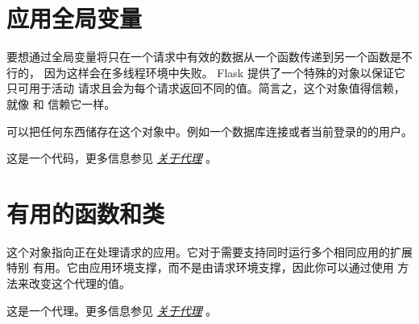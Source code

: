 \documentclass[a4paper,12pt]{sphinxmanual}
\begin{document}
\section{应用全局变量}
\label{api:id9}
要想通过全局变量将只在一个请求中有效的数据从一个函数传递到另一个函数是不行的，
因为这样会在多线程环境中失败。 Flask 提供了一个特殊的对象以保证它只可用于活动
请求且会为每个请求返回不同的值。简言之，这个对象值得信赖，就像
{\hyperref[api:flask.request]{}} 和 {\hyperref[api:flask.session]{}} 信赖它一样。

\begin{fulllineitems}
\label{api:flask.g}
可以把任何东西储存在这个对象中。例如一个数据库连接或者当前登录的的用户。

这是一个代码，更多信息参见 {\hyperref[reqcontext:notes-on-proxies]{\emph{关于代理}}} 。

\end{fulllineitems}



\section{有用的函数和类}
\label{api:id10}

\begin{fulllineitems}
\label{api:flask.current_app}
这个对象指向正在处理请求的应用。它对于需要支持同时运行多个相同应用的扩展特别
有用。它由应用环境支撑，而不是由请求环境支撑，因此你可以通过使用
{\hyperref[api:flask.Flask.app_context]{}} 方法来改变这个代理的值。

这是一个代理。更多信息参见 {\hyperref[reqcontext:notes-on-proxies]{\emph{关于代理}}} 。

\end{fulllineitems}

\end{document}
